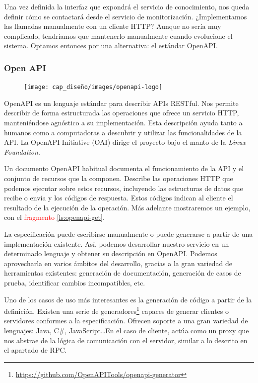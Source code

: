 Una vez definida la interfaz que expondrá el servicio de conocimiento, nos queda definir cómo se contactará desde el servicio de monitorización. ¿Implementamos las llamadas manualmente con un cliente HTTP? Aunque no sería muy complicado, tendríamos que mantenerlo manualmente cuando evolucione el sistema. Optamos entonces por una alternativa: el estándar OpenAPI.

\subsubsection{Open API}
\label{chap:OpenAPI}

\begin{figure}
  \vspace{5pt}
  \texttt{[image: cap\_diseño/images/openapi-logo]}
  \centering
  \vspace{5pt}
\end{figure}

OpenAPI es un lenguaje estándar para describir APIs RESTful. Nos permite describir de forma estructurada las operaciones que ofrece un servicio HTTP, manteniéndose agnóstico a su implementación. Esta descripción ayuda tanto a humanos como a computadoras a descubrir y utilizar las funcionalidades de la API. La OpenAPI Initiative (OAI) dirige el proyecto bajo el manto de la \emph{Linux Foundation}.

Un documento OpenAPI habitual documenta el funcionamiento de la API y el conjunto de recursos que la componen. Describe las operaciones HTTP que podemos ejecutar sobre estos recursos, incluyendo las estructuras de datos que recibe o envía y los códigos de respuesta. Estos códigos indican al cliente el resultado de la ejecución de la operación. \cite{openapi_initiativeOpenAPISpecificationV3} Más adelante mostraremos un ejemplo, con el \textcolor{red}{fragmento} \ref{ls:openapi-get}.

La especificación puede escribirse manualmente o puede generarse a partir de una implementación existente. Así, podemos desarrollar nuestro servicio en un determinado lenguaje y obtener su descripción en OpenAPI. Podemos aprovecharla en varios ámbitos del desarrollo, gracias a la gran variedad de herramientas existentes: generación de documentación, generación de casos de prueba, identificar cambios incompatibles, etc. \cite{westerveldChapterOpenAPIAPI2021}

Uno de los casos de uso más interesantes es la generación de código a partir de la definición. Existen una serie de generadores\footnote{\url{https://github.com/OpenAPITools/openapi-generator}} capaces de generar clientes o servidores conformes a la especificación. Ofrecen soporte a una gran variedad de lenguajes: Java, C\#, JavaScript\dots En el caso de cliente, actúa como un proxy que nos abstrae de la lógica de comunicación con el servidor, similar a lo descrito en el apartado de RPC.

